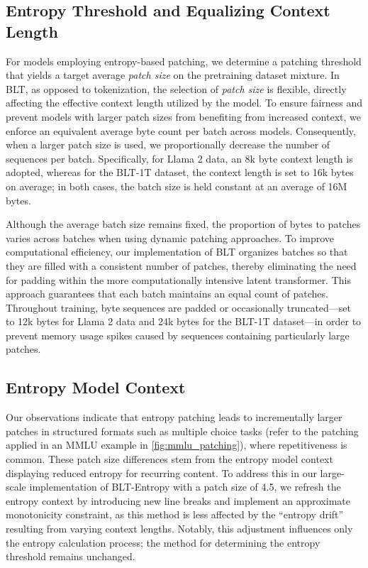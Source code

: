 \subsection{Entropy Threshold and Equalizing Context Length} For models employing entropy-based patching, we determine a patching threshold that yields a target average \textit{patch size} on the pretraining dataset mixture. In {\textsc BLT}, as opposed to tokenization, the selection of \textit{patch size} is flexible, directly affecting the effective context length utilized by the model. To ensure fairness and prevent models with larger patch sizes from benefiting from increased context, we enforce an equivalent average byte count per batch across models. Consequently, when a larger patch size is used, we proportionally decrease the number of sequences per batch. Specifically, for Llama 2 data, an 8k byte context length is adopted, whereas for the {\textsc BLT}-1T dataset, the context length is set to 16k bytes on average; in both cases, the batch size is held constant at an average of 16M bytes.

Although the average batch size remains fixed, the proportion of bytes to patches varies across batches when using dynamic patching approaches. To improve computational efficiency, our implementation of {\textsc BLT} organizes batches so that they are filled with a consistent number of patches, thereby eliminating the need for padding within the more computationally intensive latent transformer. This approach guarantees that each batch maintains an equal count of patches. Throughout training, byte sequences are padded or occasionally truncated—set to 12k bytes for Llama 2 data and 24k bytes for the {\textsc BLT}-1T dataset—in order to prevent memory usage spikes caused by sequences containing particularly large patches.

\subsection{Entropy Model Context}
\label{section:entropy-context}
Our observations indicate that entropy patching leads to incrementally larger patches in structured formats such as multiple choice tasks (refer to the patching applied in an MMLU example in \autoref{fig:mmlu_patching}), where repetitiveness is common. These patch size differences stem from the entropy model context displaying reduced entropy for recurring content. To address this in our large-scale implementation of {\textsc BLT}-Entropy with a patch size of 4.5, we refresh the entropy context by introducing new line breaks and implement an approximate monotonicity constraint, as this method is less affected by the “entropy drift” resulting from varying context lengths. Notably, this adjustment influences only the entropy calculation process; the method for determining the entropy threshold remains unchanged.

